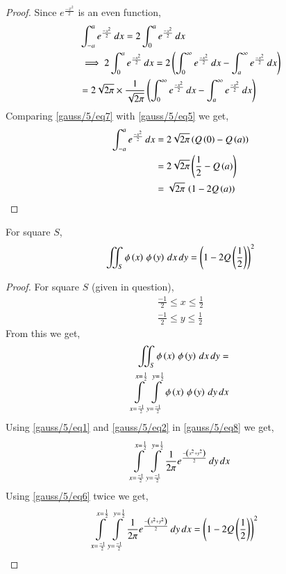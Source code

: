     \begin{proof}
    Since $e^{\frac{-x^2}{2}}$ is an even function,
    \begin{align}
        &\int_{-a}^{a} e^{\frac{-x^2}{2}}\, dx = 2\int_{0}^{a} e^{\frac{-x^2}{2}}\, dx\\
        &\implies 2\int_{0}^{a} e^{\frac{-x^2}{2}}\, dx = 2 \left(\int_{0}^{\infty} e^{\frac{-x^2}{2}}\, dx - \int_{a}^{\infty} e^{\frac{-x^2}{2}}\, dx\right) \nonumber\\
        &= 2\sqrt{2\pi} \times \frac{1}{\sqrt{2\pi}} \left(\int_{0}^{\infty} e^{\frac{-x^2}{2}}\, dx - \int_{a}^{\infty} e^{\frac{-x^2}{2}}\, dx\right) \label{gauss/5/eq7}
    \end{align}
    Comparing \eqref{gauss/5/eq7} with \eqref{gauss/5/eq5} we get,
    \begin{align}
        \int_{-a}^{a} e^{\frac{-x^2}{2}}\, dx &= 2\sqrt{2\pi}\left(Q\left(0\right) - Q\left(a\right)\right)\\
        &= 2\sqrt{2\pi}\left(\frac{1}{2} - Q\left(a\right)\right)\\
        &= \sqrt{2\pi}\,\left(1 - 2Q\left(a\right)\right)
    \end{align}
    \end{proof}
    \begin{lemma}
    For square $S$,
    \begin{align}
        \iint_S{\phi\left(x\right)\,\phi\left(y\right)\,dx\,dy} = \left(1-2Q\left(\frac{1}{2}\right)\right)^2 \label{gauss/5/eq10}
    \end{align}
    \end{lemma}
    \begin{proof}
    For square $S$ (given in question),
    \begin{align}
        \frac{-1}{2}\leq x \leq \frac{1}{2}\\
        \frac{-1}{2}\leq y \leq \frac{1}{2}
    \end{align}
    From this we get,
    \begin{align}
        \iint_S{\phi\left(x\right)\,\phi\left(y\right)\,dx\,dy} = \nonumber\\
        \int\limits_{x=\frac{-1}{2}}^{x=\frac{1}{2}} \int\limits_{y=\frac{-1}{2}}^{y=\frac{1}{2}} \phi\left(x\right)\,\phi\left(y\right)\,dy\,dx \label{gauss/5/eq8}
    \end{align}
    Using \eqref{gauss/5/eq1} and \eqref{gauss/5/eq2} in \eqref{gauss/5/eq8} we get,
    \begin{align}
        \int\limits_{x=\frac{-1}{2}}^{x=\frac{1}{2}} \int\limits_{y=\frac{-1}{2}}^{y=\frac{1}{2}}\frac{1}{2\pi}e^\frac{-\left(x^2+y^2\right)}{2}\,dy\,dx
    \end{align}
    Using \eqref{gauss/5/eq6} twice we get,
    \begin{align}
        \int\limits_{x=\frac{-1}{2}}^{x=\frac{1}{2}} \int\limits_{y=\frac{-1}{2}}^{y=\frac{1}{2}}\frac{1}{2\pi}e^\frac{-\left(x^2+y^2\right)}{2}\,dy\,dx &= \left(1-2Q\left(\frac{1}{2}\right)\right)^2
    \end{align}
    \end{proof}
